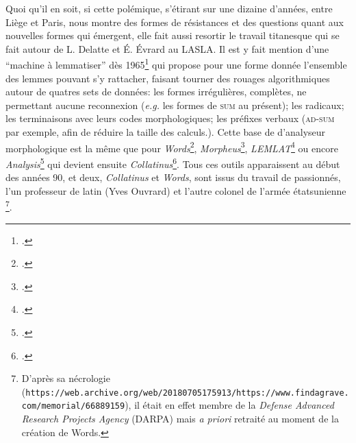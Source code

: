 Quoi qu'il en soit, si cette polémique, s'étirant sur une dizaine d'années, entre Liège et Paris, nous montre des formes de résistances et des questions quant aux nouvelles formes qui émergent, elle fait aussi resortir le travail titanesque qui se fait autour de L. Delatte et É. Évrard au LASLA. Il est y fait mention d'une \enquote{machine à lemmatiser} dès 1965\footcite{delatte_programme_1965} qui propose pour une forme donnée l'ensemble des lemmes pouvant s'y rattacher, faisant tourner des rouages algorithmiques autour de quatres sets de données: les formes irrégulières, complètes, ne permettant aucune reconnexion (\textit{e.g.} les formes de \textsc{sum} au présent); les radicaux; les terminaisons avec leurs codes morphologiques; les préfixes verbaux (\textsc{ad-sum} par exemple, afin de réduire la taille des calculs.). Cette base de d'analyseur morphologique est la même que pour \textit{Words}\footcite{whitaker_words_1993}, \textit{Morpheus}\footcite{crane_generating_1991}, \textit{LEMLAT}\footcite{bozzi_lemlat_1992} ou encore \textit{Analysis}\footcite{ouvrard_analysis_1992} qui devient ensuite \textit{Collatinus}\footcite{ouvrard_collatinus_1999}. Tous ces outils apparaissent au début des années 90, et deux, \textit{Collatinus} et \textit{Words}, sont issus du travail de passionnés, l'un professeur de latin (Yves Ouvrard) et l'autre colonel de l'armée étatsunienne \footnote{D'après sa nécrologie (\texttt{https://web.archive.org/web/20180705175913/https://www.findagrave.com/memorial/66889159}), il était en effet membre de la \textit{Defense Advanced Research Projects Agency} (DARPA) mais \textit{a priori} retraité au moment de la création de Words.}.

